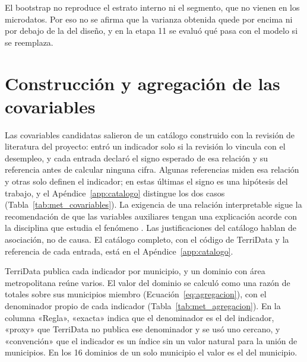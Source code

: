 El bootstrap no reproduce el estrato interno ni el segmento, que no vienen en los microdatos. Por eso no se afirma que la varianza obtenida quede por encima ni por debajo de la del diseño, y en la etapa 11 se evaluó qué pasa con el modelo si se reemplaza.

\section{Construcción y agregación de las covariables}
\label{sec:met_covariables}

Las covariables candidatas salieron de un catálogo construido con la revisión de literatura del proyecto: entró un indicador solo si la revisión lo vincula con el desempleo, y cada entrada declaró el signo esperado de esa relación y su referencia antes de calcular ninguna cifra. Algunas referencias miden esa relación y otras solo definen el indicador; en estas últimas el signo es una hipótesis del trabajo, y el Apéndice~\ref{app:catalogo} distingue los dos casos (Tabla~\ref{tab:met_covariables}). La exigencia de una relación interpretable sigue la recomendación de que las variables auxiliares tengan una explicación acorde con la disciplina que estudia el fenómeno \cite[p.~453]{morales2021smallarea}. Las justificaciones del catálogo hablan de asociación, no de causa. El catálogo completo, con el código de TerriData y la referencia de cada entrada, está en el Apéndice~\ref{app:catalogo}.

TerriData publica cada indicador por municipio, y un dominio con área metropolitana reúne varios. El valor del dominio se calculó como una razón de totales sobre sus municipios miembro (Ecuación~\ref{eq:agregacion}), con el denominador propio de cada indicador (Tabla~\ref{tab:met_agregacion}). En la columna «Regla», «exacta» indica que el denominador es el del indicador, «proxy» que TerriData no publica ese denominador y se usó uno cercano, y «convención» que el indicador es un índice sin un valor natural para la unión de municipios. En los 16 dominios de un solo municipio el valor es el del municipio.

